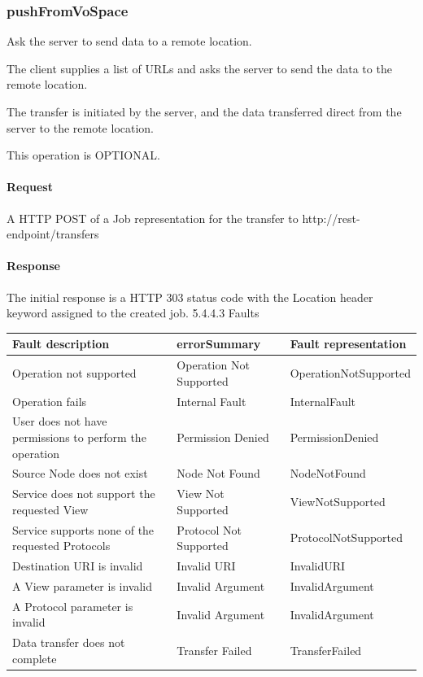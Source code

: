 \documentclass[11pt,a4paper]{ivoa}
\begin{document}
\subsubsection{pushFromVoSpace}
\label{subsubsec:pushfromvospace}
Ask the server to send data to a remote location.

The client supplies a list of URLs and asks the server to send the data to the remote location.

The transfer is initiated by the server, and the data transferred direct from the server to the remote location.

This operation is OPTIONAL.

\paragraph{Request}
A HTTP POST of a Job representation for the transfer to http://rest-endpoint/transfers

\paragraph{Response}
The initial response is a HTTP 303 status code with the Location header keyword assigned to the created job.
5.4.4.3 Faults

\vspace{3mm}
\begin{tabular}{ p{5cm} l p{4cm} }
\textbf{Fault description} & \textbf{errorSummary} & \textbf{Fault representation} \\
\hline
Operation not supported & Operation Not Supported & OperationNotSupported \\
\hline
Operation fails & Internal Fault & InternalFault \\
\hline
User does not have permissions to perform the operation	 & Permission Denied & PermissionDenied \\
\hline
Source Node does not exist & Node Not Found & NodeNotFound \\
\hline
Service does not support the requested View & View Not Supported & ViewNotSupported \\
\hline
Service supports none of the requested Protocols & Protocol Not Supported &ProtocolNotSupported \\
\hline
Destination URI is invalid & Invalid URI & InvalidURI \\
\hline
A View parameter is invalid & Invalid Argument & InvalidArgument \\
\hline
A Protocol parameter is invalid & Invalid Argument & InvalidArgument \\
\hline
Data transfer does not complete & Transfer Failed & TransferFailed \\
\hline
\end{tabular}
\vspace{3mm}
\end{document}
